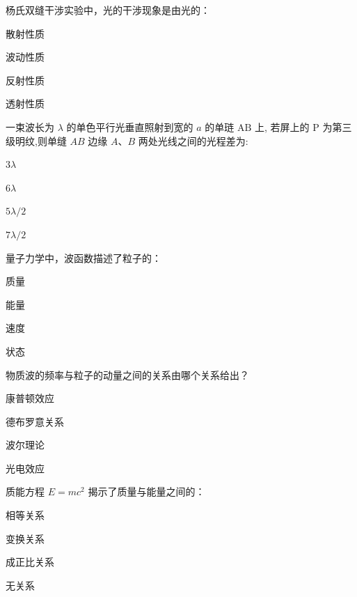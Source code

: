 \documentclass{njustexam}
\begin{document}
\begin{problem}

杨氏双缝干涉实验中，光的干涉现象是由光的：
\begin{abcd}
  \item 散射性质
  \item 波动性质
  \item 反射性质
  \item 透射性质
\end{abcd}
\end{problem}



\begin{problem}
一束波长为 $\lambda$ 的单色平行光垂直照射到宽的 $a$ 的单琏 $\mathrm{AB}$ 上, 
    若屏上的 $\mathrm{P}$ 为第三级明纹,则单缝 $A B$ 边缘 $A 、 B$ 两处光线之间的光程差为: 
    \begin{abcd}
      \item $3 \lambda$
      \item $6 \lambda$
      \item $5 \lambda / 2$
      \item $7 \lambda / 2$
    \end{abcd}
\end{problem}
  
\begin{problem}

  量子力学中，波函数描述了粒子的：
  \begin{abcd}
    \item 质量
    \item 能量
    \item 速度
    \item 状态
  \end{abcd}
\end{problem}

\begin{problem}

物质波的频率与粒子的动量之间的关系由哪个关系给出？
\begin{abcd}
  \item 康普顿效应
  \item 德布罗意关系
  \item 波尔理论
  \item 光电效应
\end{abcd}
\end{problem}

\begin{problem}

  质能方程 $E=mc^2$ 揭示了质量与能量之间的：
  \begin{abcd}
    \item 相等关系
    \item 变换关系
    \item 成正比关系
    \item 无关系
  \end{abcd}
  \end{problem}
\end{document}
